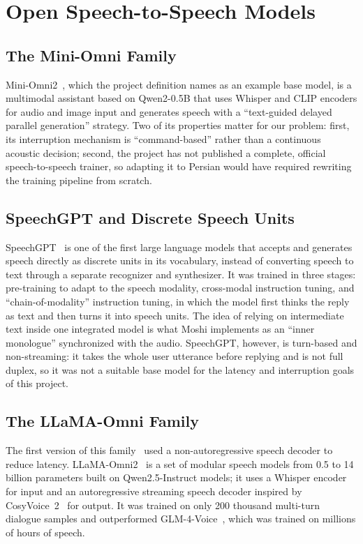 \section{Open Speech-to-Speech Models}
\label{sec:openmodels}

\subsection{The Mini-Omni Family}

Mini-Omni2~\cite{xie2024miniomni2}, which the project definition names as an
example base model, is a multimodal assistant based on Qwen2-0.5B that uses Whisper
and CLIP encoders for audio and image input and generates speech with a
``text-guided delayed parallel generation'' strategy. Two of its properties matter
for our problem: first, its interruption mechanism is ``command-based'' rather than
a continuous acoustic decision; second, the project has not published a complete,
official speech-to-speech trainer, so adapting it to Persian would have required
rewriting the training pipeline from scratch.

\subsection{SpeechGPT and Discrete Speech Units}

SpeechGPT~\cite{zhang2023speechgpt} is one of the first large language models that
accepts and generates speech directly as discrete units in its vocabulary, instead
of converting speech to text through a separate recognizer and synthesizer. It was
trained in three stages: pre-training to adapt to the speech modality, cross-modal
instruction tuning, and ``chain-of-modality'' instruction tuning, in which the model
first thinks the reply as text and then turns it into speech units. The idea of
relying on intermediate text inside one integrated model is what Moshi implements
as an ``inner monologue'' synchronized with the audio. SpeechGPT, however, is
turn-based and non-streaming: it takes the whole user utterance before replying and
is not full duplex, so it was not a suitable base model for the latency and
interruption goals of this project.

\subsection{The LLaMA-Omni Family}

The first version of this family~\cite{fang2025llamaomni} used a non-autoregressive
speech decoder to reduce latency. LLaMA-Omni2~\cite{fang2025llamaomni2} is a set of
modular speech models from 0.5 to 14 billion parameters built on Qwen2.5-Instruct
models; it uses a Whisper encoder for input and an autoregressive streaming speech
decoder inspired by CosyVoice~2~\cite{du2024cosyvoice2} for output. It was trained
on only 200 thousand multi-turn dialogue samples and outperformed
GLM-4-Voice~\cite{zeng2024glm4voice}, which was trained on millions of hours of
speech.

